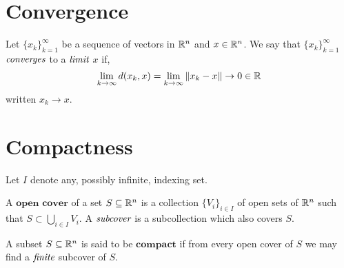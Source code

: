 
\section{Convergence} %
\label{sec:convergence}

\begin{defn}[Limit]
	Let $\{x_k\}_{k=1}^{\infty}$ be a sequence of
	vectors in $\mathbb{R}^n$ and $x \in \mathbb{R}^n$. We say that
	$\{x_k\}_{k=1}^{\infty}$ $\emph{converges}$ to
	a $\emph{limit}$ $x$ if,
	\[
		\lim_{k \to \infty} d(x_k,x) =
		\lim_{k \to \infty} \| x_k - x \| \to 0 \in \mathbb{R}
	\]
	written $x_k \to x$.
\end{defn}

\section{Compactness} %
\label{sec:compactness}

Let $I$ denote any, possibly infinite, indexing set.

\begin{defn}
	A $\textbf{open cover}$ of a set $S \subseteq \mathbb{R}^n$
	is a collection $\{V_i\}_{i \in I}$ of open sets of
	$\mathbb{R}^n$ such that $S \subset \bigcup_{i \in I} V_i$.
	A $\emph{subcover}$ is a subcollection which also
	covers $S$.
\end{defn}

\begin{defn}[Compact]
	A subset $S \subseteq \mathbb{R}^n$ is said to be $\textbf{compact}$
	if from every open cover of $S$ we may find a $\emph{finite}$
	subcover of $S$.
\end{defn}
